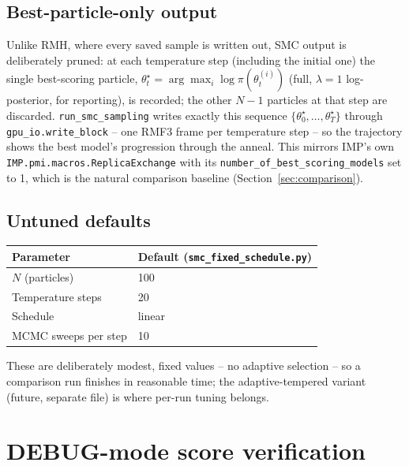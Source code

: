 \documentclass[11pt]{article}
\begin{document}
\subsection{Best-particle-only output}

Unlike RMH, where every saved sample is written out, SMC output is
deliberately pruned: at each temperature step (including the initial one)
the single best-scoring particle,
$\theta^\star_t = \arg\max_i \log\pi(\theta^{(i)}_t)$ (full, $\lambda=1$
log-posterior, for reporting), is recorded; the other $N-1$ particles at
that step are discarded. \texttt{run\_smc\_sampling} writes exactly this
sequence $\{\theta^\star_0, \dots, \theta^\star_T\}$ through
\texttt{gpu\_io.write\_block} -- one RMF3 frame per temperature step -- so
the trajectory shows the best model's progression through the anneal. This
mirrors IMP's own \texttt{IMP.pmi.macros.ReplicaExchange} with its
\texttt{number\_of\_best\_scoring\_models} set to 1, which is the natural
comparison baseline (Section~\ref{sec:comparison}).

\subsection{Untuned defaults}

\begin{center}
\begin{tabular}{@{}ll@{}}
\toprule
Parameter & Default (\texttt{smc\_fixed\_schedule.py}) \\
\midrule
$N$ (particles) & 100 \\
Temperature steps & 20 \\
Schedule & linear \\
MCMC sweeps per step & 10 \\
\bottomrule
\end{tabular}
\end{center}
These are deliberately modest, fixed values -- no adaptive selection -- so
a comparison run finishes in reasonable time; the adaptive-tempered variant
(future, separate file) is where per-run tuning belongs.

\section{DEBUG-mode score verification}
\label{sec:debug}
\end{document}
